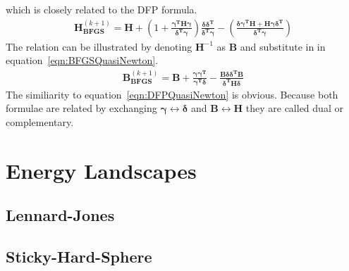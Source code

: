which is closely related to the \ac{DFP} formula.
%
\begin{align}
    \mathbf{H}_\mathbf{BFGS}^{(k+1)}=\mathbf{H}
    +\left(1+\frac{\bm{\gamma}^\mathbf{T}\mathbf{H}\bm{\gamma}}{\bm{\delta}^\mathbf{T}\bm{\gamma}}\right)
    \frac{\bm{\delta\delta}^\mathbf{T}}{\bm{\delta}^\mathbf{T}\bm{\gamma}}
    -\left(\frac{\bm{\delta\gamma}^\mathbf{T}\mathbf{H}+\mathbf{H}\bm{\gamma\delta}^\mathbf{T}}{\bm{\delta}^\mathbf{T}\bm{\gamma}}\right)\label{eqn:BFGSQuasiNewton}
\end{align}
%
The relation can be illustrated by denoting $\mathbf{H}^{-1}$ as $\mathbf{B}$
and substitute in in equation~\eqref{eqn:BFGSQuasiNewton}.
%
\begin{align}
    \mathbf{B}_\mathbf{BFGS}^{(k+1)}=\mathbf{B}+\frac{\bm{\gamma\gamma}^\mathbf{T}}{\bm{\gamma}^\mathbf{T}\bm{\delta}}
    -\frac{\mathbf{B}\bm{\delta\delta}^\mathbf{T}\mathbf{B}}{\bm{\delta}^\mathbf{T}\mathbf{H}\bm{\delta}}
\end{align}
%
The similiarity to equation~\eqref{eqn:DFPQuasiNewton} is obvious. Because both
formulae are related by exchanging $\bm{\gamma}\leftrightarrow\bm{\delta}$ and
$\mathbf{B}\leftrightarrow\mathbf{H}$ they are called dual or complementary.




\chapter{Energy Landscapes}
\label{sec:energylandscapes}

\section{Lennard-Jones}
\label{sec:LennardJones}

\section{Sticky-Hard-Sphere}
\label{sec:SHS}
